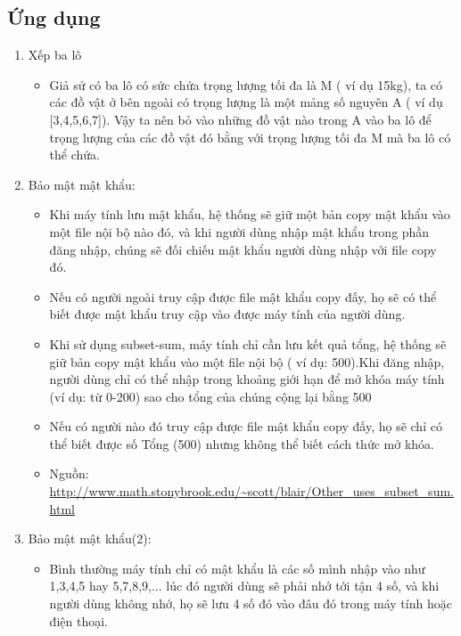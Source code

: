 \documentclass{article}
\begin{document}
    \subsection{ \fontsize{16}{16}\selectfont\textbf{Ứng dụng}}
        \begin{enumerate}
            \item Xếp ba lô\\
            \begin{itemize}
                \item Giả sử có ba lô có sức chứa trọng lượng tối đa là M ( ví dụ 15kg), ta có các đồ vật ở bên ngoài có trọng lượng là một mảng số nguyên A ( ví dụ [3,4,5,6,7]). Vậy ta nên bỏ vào những đồ vật nào trong A vào ba lô để trọng lượng của các đồ vật đó bằng với trọng lượng tối đa M mà ba lô có thể chứa.\\
            \end{itemize}
            \item Bảo mật mật khẩu:\\
            \begin{itemize}
                \item Khi máy tính lưu mật khẩu, hệ thống sẽ giữ một bản copy mật khẩu vào một file nội bộ nào đó, và khi người dùng nhập mật khẩu trong phần đăng nhập, chúng sẽ đối chiếu mật khẩu người dùng nhập với file copy đó. 
                \item Nếu có người ngoài truy cập được file mật khẩu copy đấy, họ sẽ có thể biết được mật khẩu truy cập vào được máy tính của người dùng.
                \item Khi sử dụng subset-sum, máy tính chỉ cần lưu kết quả tổng,  hệ thống sẽ giữ bản copy mật khẩu vào một file nội bộ ( ví dụ: 500).Khi đăng nhập, người dùng chỉ có thể nhập trong khoảng giới hạn để mở khóa máy tính (ví dụ: từ 0-200) sao cho tổng của chúng cộng lại bằng 500
                \item Nếu có người nào đó truy cập được file mật khẩu copy đấy, họ sẽ chỉ có thể biết được số Tổng (500) nhưng không thể biết cách thức mở khóa.
                \item Nguồn: \url{http://www.math.stonybrook.edu/~scott/blair/Other_uses_subset_sum.html}
            \end{itemize}
            \item Bảo mật mật khẩu(2):\\
            \begin{itemize}
                \item Bình thường máy tính chỉ có mật khẩu là các số mình nhập vào như 1,3,4,5 hay 5,7,8,9,... lúc đó người dùng sẽ phải nhớ tới tận 4 số, và khi người dùng không nhớ, họ sẽ lưu 4 số đó vào đâu đó trong máy tính hoặc điện thoại.

\end{itemize}
\end{enumerate}
\end{document}

